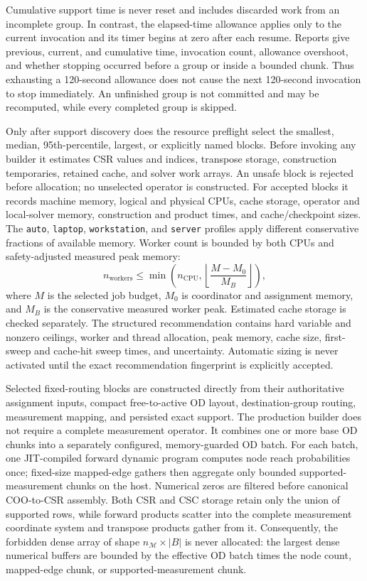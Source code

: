 Cumulative support time is never reset and includes discarded work from an
incomplete group.  In contrast, the elapsed-time allowance applies only to the
current invocation and its timer begins at zero after each resume.  Reports
give previous, current, and cumulative time, invocation count, allowance
overshoot, and whether stopping occurred before a group or inside a bounded
chunk.  Thus exhausting a 120-second allowance does not cause the next
120-second invocation to stop immediately.  An unfinished group is not
committed and may be recomputed, while every completed group is skipped.

Only after support discovery does the resource preflight select the smallest,
median, 95th-percentile, largest, or explicitly named blocks.  Before invoking
any builder it estimates CSR values and indices, transpose storage,
construction temporaries, retained cache, and solver work arrays.  An unsafe
block is rejected before allocation; no unselected operator is constructed.
For accepted blocks it records machine memory,
logical and physical CPUs, cache storage, operator and local-solver memory,
construction and product times, and cache/checkpoint sizes.  The \texttt{auto},
\texttt{laptop}, \texttt{workstation}, and \texttt{server} profiles apply
different conservative fractions of available memory.  Worker count is bounded
by both CPUs and safety-adjusted measured peak memory:
\[
n_{\mathrm{workers}}
\leq
\min\!\left(
n_{\mathrm{CPU}},
\left\lfloor\frac{M-M_0}{M_B}\right\rfloor
\right),
\]
where $M$ is the selected job budget, $M_0$ is coordinator and assignment
memory, and $M_B$ is the conservative measured worker peak.  Estimated cache
storage is checked separately.  The structured recommendation contains hard
variable and nonzero ceilings, worker and thread allocation, peak memory,
cache size, first-sweep and cache-hit sweep times, and uncertainty.  Automatic
sizing is never activated until the exact recommendation fingerprint is
explicitly accepted.

Selected fixed-routing blocks are constructed directly from their authoritative
assignment inputs, compact free-to-active OD layout, destination-group routing,
measurement mapping, and persisted exact support.  The production builder does
not require a complete measurement operator.  It combines one or more base OD
chunks into a separately configured, memory-guarded OD batch. For each batch,
one JIT-compiled forward dynamic program computes node reach probabilities once;
fixed-size mapped-edge gathers
then aggregate only bounded supported-measurement chunks on the host. Numerical
zeros are filtered before canonical COO-to-CSR assembly.  Both CSR and
CSC storage retain only the union of supported rows, while forward products
scatter into the complete measurement coordinate system and transpose products
gather from it.  Consequently, the forbidden dense array of shape
$n_{\mathcal M}\times |B|$ is never allocated: the largest dense numerical
buffers are bounded by the effective OD batch times the node count, mapped-edge chunk,
or supported-measurement chunk.


